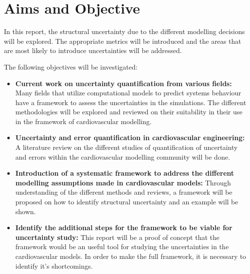 \chapter{Aims and Objective}
\label{chapterlabel2}

In this report, the structural uncertainty due to the different modelling decisions will be explored. The appropriate metrics will be introduced and the areas that are most likely to introduce uncertainties will be addressed.\par

The following objectives will be investigated:
\begin{itemize}
    \item \textbf{Current work on uncertainty quantification from various fields:} Many fields that utilize computational models to predict systems behaviour have a framework to assess the uncertainties in the simulations. The different methodologies will be explored and reviewed on their suitability in their use in the framework of cardiovascular modelling.
    \item \textbf{Uncertainty and error quantification in cardiovascular engineering:} A literature review on the different studies of quantification of uncertainty and errors within the cardiovascular modelling community will be done.
    \item \textbf{Introduction of a systematic framework to address the different modelling assumptions made in cardiovascular models:} Through understanding of the different methods and reviews, a framework will be proposed on how to identify structural uncertainty and an example will be shown.
    \item \textbf{Identify the additional steps for the framework to be viable for uncertainty study:} This report will be a proof of concept that the framework would be an useful tool for studying the uncertainties in the cardiovascular models. In order to make the full framework, it is necessary to identify it's shortcomings.
\end{itemize}